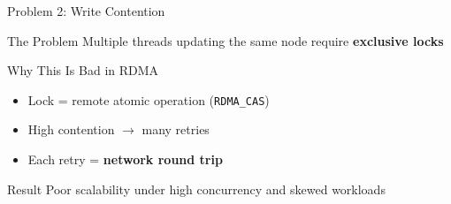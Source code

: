 \documentclass[aspectratio=169,10pt]{beamer}
\newcommand{\sys}[1]{\texttt{#1}}
\begin{document}
\begin{frame}{Problem 2: Write Contention}

\begin{block}{The Problem}
Multiple threads updating the same node require \textbf{exclusive locks}
\end{block}

\vspace{0.2cm}

\begin{alertblock}{Why This Is Bad in RDMA}
\begin{itemize}
    \item Lock = remote atomic operation (\sys{RDMA\_CAS})
    \item High contention $\rightarrow$ many retries
    \item Each retry = \textbf{network round trip}
\end{itemize}
\end{alertblock}

\vspace{0.2cm}

\begin{block}{Result}
Poor scalability under high concurrency and skewed workloads
\end{block}

\end{frame}
\end{document}
